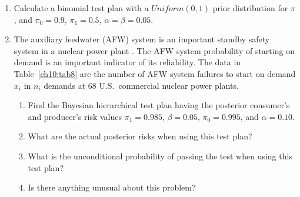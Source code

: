 \documentclass {book}
\begin{document}
\begin{enumerate}[\ref{ch10}.1]
\item Calculate a binomial test plan with a $Uniform(0,1)$ prior
distribution for $\pi$, and $\pi_0 = 0.9$, $\pi_1 = 0.5$, $\alpha
= \beta = 0.05$.

\item \label{exercise:ch10AFW} The auxiliary feedwater (AFW)
system is an important standby safety system in a nuclear power
plant \citep{PGGGK98}. The AFW system probability of starting on demand is an
important indicator of its reliability. The data in
Table~\ref{ch10:tab8} are the number of AFW system failures to
start on demand $x_{i}$ in $n_{i}$ demands at 68 U.S.\ commercial
nuclear power plants. \begin{enumerate} \item Find the Bayesian
hierarchical test plan having the posterior consumer's and
producer's risk values $\pi_{1} = 0.985$, $\beta = 0.05$, $\pi_{0}
= 0.995$, and $\alpha = 0.10$. \item What are the actual posterior
risks when using this test plan? \item What is the unconditional
probability of passing the test when using this test plan? \item
Is there anything unusual about this problem?\end{enumerate}


\end{enumerate}
\end{document}
